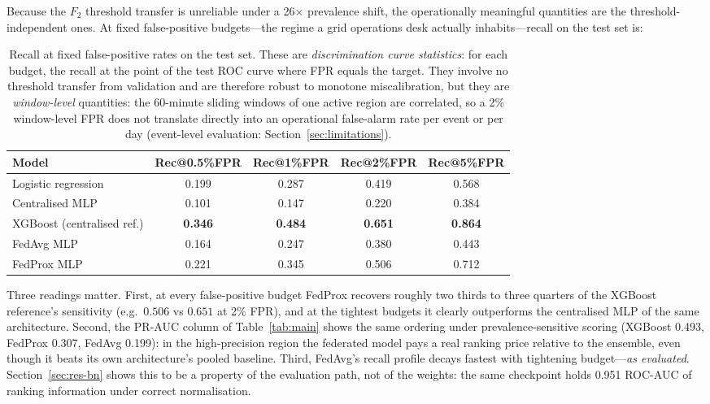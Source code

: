 Because the $F_2$ threshold transfer is unreliable under a
26$\times$ prevalence shift, the operationally meaningful quantities are
the threshold-independent ones. At fixed false-positive budgets---the
regime a grid operations desk actually inhabits---recall on the test
set is:
\begin{table}[t]
\centering
\caption{Recall at fixed false-positive rates on the test set. These
are \emph{discrimination curve statistics}: for each budget, the recall
at the point of the test ROC curve where FPR equals the target. They
involve no threshold transfer from validation and are therefore robust
to monotone miscalibration, but they are \emph{window-level}
quantities: the 60-minute sliding windows of one active region are
correlated, so a 2\% window-level FPR does not translate directly into
an operational false-alarm rate per event or per day (event-level
evaluation: Section~\ref{sec:limitations}).}
\label{tab:recallfpr}
\small
\begin{tabularx}{0.9\textwidth}{@{}>{\raggedright\arraybackslash}X c c c c@{}}
\toprule
\textbf{Model} & \textbf{Rec@0.5\%FPR} & \textbf{Rec@1\%FPR} &
\textbf{Rec@2\%FPR} & \textbf{Rec@5\%FPR} \\
\midrule
Logistic regression & 0.199 & 0.287 & 0.419 & 0.568 \\
Centralised MLP & 0.101 & 0.147 & 0.220 & 0.384 \\
XGBoost (centralised ref.) & \textbf{0.346} & \textbf{0.484} &
\textbf{0.651} & \textbf{0.864} \\
FedAvg MLP & 0.164 & 0.247 & 0.380 & 0.443 \\
FedProx MLP & 0.221 & 0.345 & 0.506 & 0.712 \\
\bottomrule
\end{tabularx}
\end{table}

Three readings matter. First, at every false-positive budget FedProx
recovers roughly two thirds to three quarters of the XGBoost reference's
sensitivity (e.g.\ $0.506$ vs $0.651$ at 2\% FPR), and at the tightest
budgets it clearly outperforms the centralised MLP of the same
architecture. Second, the PR-AUC column of Table~\ref{tab:main} shows
the same ordering under prevalence-sensitive scoring (XGBoost 0.493,
FedProx 0.307, FedAvg 0.199): in the high-precision region the federated
model pays a real ranking price relative to the ensemble, even though it
beats its own architecture's pooled baseline. Third, FedAvg's recall
profile decays fastest with tightening budget---\emph{as evaluated}.
Section~\ref{sec:res-bn} shows this to be a property of the evaluation
path, not of the weights: the same checkpoint holds 0.951 ROC-AUC of
ranking information under correct normalisation.


